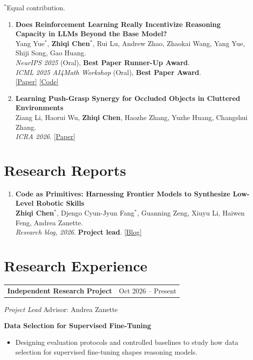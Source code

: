 \documentclass[11pt,letterpaper]{article}
\makeatletter
\newcommand{\headerrow}[2]{%
    \begin{tabular*}{\linewidth}{@{}l@{\extracolsep{\fill}}r@{}}
        #1 & #2 \\
    \end{tabular*}\par
}
\makeatother
\begin{document}
{\small $^{*}$Equal contribution.}

\begin{enumerate}[leftmargin=1.5em,topsep=4pt,itemsep=7pt,parsep=0pt]
    \item
    \textbf{Does Reinforcement Learning Really Incentivize Reasoning Capacity in LLMs Beyond the Base Model?}\\
    Yang Yue$^{*}$, \textbf{Zhiqi Chen}$^{*}$, Rui Lu, Andrew Zhao, Zhaokai Wang, Yang Yue, Shiji Song, Gao Huang.\\
    \emph{NeurIPS 2025} (Oral), \textbf{Best Paper Runner-Up Award}.\\
    \emph{ICML 2025 AI4Math Workshop} (Oral), \textbf{Best Paper Award}.\\
    \href{https://arxiv.org/abs/2504.13837}{[Paper]} \href{https://github.com/LeapLabTHU/limit-of-RLVR}{[Code]}

    \item
    \textbf{Learning Push-Grasp Synergy for Occluded Objects in Cluttered Environments}\\
    Ziang Li, Haorui Wu, \textbf{Zhiqi Chen}, Haozhe Zhang, Yuzhe Huang, Changshui Zhang.\\
    \emph{ICRA 2026}.
    \href{https://doi.org/10.1109/ICRA57385.2026.11695822}{[Paper]}
\end{enumerate}

\section*{Research Reports}

\begin{enumerate}[leftmargin=1.5em,topsep=4pt,itemsep=7pt,parsep=0pt]
    \item
    \textbf{Code as Primitives: Harnessing Frontier Models to Synthesize Low-Level Robotic Skills}\\
    \textbf{Zhiqi Chen}$^{*}$, Djengo Cyun-Jyun Fang$^{*}$, Guanning Zeng, Xiuyu Li, Haiwen Feng, Andrea Zanette.\\
    \emph{Research blog, 2026}. \textbf{Project lead}.
    \href{https://zhiqichen05.github.io/Code-as-Primitives/}{[Blog]}
\end{enumerate}

\section*{Research Experience}

\headerrow{\textbf{Independent Research Project}}{Oct 2026 -- Present}
\textit{Project Lead} \hfill Advisor: Andrea Zanette\par
\textbf{Data Selection for Supervised Fine-Tuning}
\begin{itemize}
    \item Designing evaluation protocols and controlled baselines to study how data selection for supervised fine-tuning shapes reasoning models.
\end{itemize}
\end{document}
